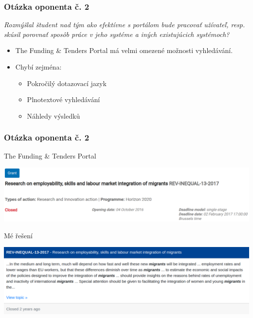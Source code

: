 \documentclass[10pt,xcolor=pdflatex]{beamer}
\begin{document}
\begin{frame}
    \frametitle{Otázka oponenta č. 2}
    \emph{Rozmýšlal študent nad tým ako efektívne s portálom bude pracovať užívateľ, resp. skúsil porovnať sposôb práce v jeho systéme a iných existujúcich systémoch?}
    \begin{itemize}
        \item The Funding \& Tenders Portal má velmi omezené možnosti vyhledávání.
        \item Chybí zejména:
        \begin{itemize}
            \item Pokročilý dotazovací jazyk
            \item Plnotextové vyhledávání
            \item Náhledy výsledků
        \end{itemize}
    \end{itemize}
\end{frame}

\begin{frame}
    \frametitle{Otázka oponenta č. 2}

    The Funding \& Tenders Portal
    \begin{center}
        \includegraphics[width=\textwidth]{img/funding_search_result.png}
    \end{center}

    \vspace{0.5cm}
    
    Mé řešení
    \begin{center}
        \includegraphics[width=\textwidth]{img/my_search_result.png}
    \end{center}
\end{frame}
\end{document}
